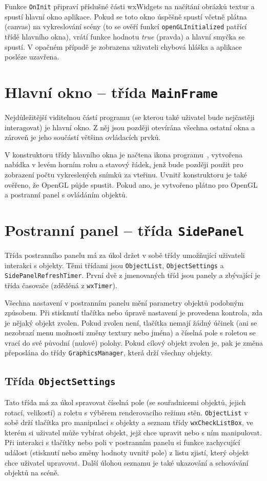 \documentclass[a4paper, 11pt]{report}
\begin{document}
Funkce \texttt{OnInit} připraví příslušné části wxWidgets na načítání obrázků textur a spustí hlavní okno aplikace. Pokud se toto okno úspěšně spustí včetně plátna (canvas) na vykreslování scény (to se ověří funkcí \texttt{openGLInitialized} patřící třídě hlavního okna), vrátí funkce hodnotu \emph{true} (pravda) a hlavní smyčka se spustí. V opačném případě je zobrazena uživateli chybová hláška a aplikace posléze uzavřena.

\section{Hlavní okno -- třída \texttt{MainFrame}}
Nejdůležitější viditelnou částí programu (se kterou také uživatel bude nejčastěji interagovat) je hlavní okno. Z něj jsou později otevírána všechna ostatní okna a zároveň je jeho součástí většina ovládacích prvků.

V konstruktoru třídy hlavního okna je načtena ikona programu~\cite{pic:icon}, vytvořena nabídka v levém horním rohu a stavový řádek, jenž bude později použit pro zobrazení počtu vykreslených snímků za vteřinu. Uvnitř konstruktoru je také ověřeno, že OpenGL půjde spustit. Pokud ano, je vytvořeno plátno pro OpenGL a postranní panel s ovládáním objektů.

\section{Postranní panel -- třída \texttt{SidePanel}}
Třída postranního panelu má za úkol držet v sobě třídy umožňující uživateli interakci s objekty. Těmi třídami jsou \texttt{ObjectList}, \texttt{ObjectSettings} a \texttt{SidePanelRefreshTimer}. První dvě z jmenovaných tříd jsou panely a zbývající je třída časovače (zděděná z \texttt{wxTimer}).

Všechna nastavení v postranním panelu mění parametry objektů podobným způsobem. Při stisknutí tlačítka nebo úpravě nastavení je provedena kontrola, zda je nějaký objekt zvolen. Pokud zvolen není, tlačítka nemají žádný účinek (ani se nezobrazí menu možnosti změny textury nebo jména) a číselná pole s roletou se vrací do své původní (nulové) polohy. Pokud cílový objekt zvolen je, pak je změna přeposlána do třídy \texttt{GraphicsManager}, která drží všechny objekty.

\subsection{Třída \texttt{ObjectSettings}}
Tato třída má za úkol spravovat číselná pole (se souřadnicemi objektů, jejich rotací, velikostí) a roletu s výběrem renderovacího režimu stěn. \texttt{ObjectList} v sobě drží tlačítka pro manipulaci s objekty a seznam třídy \texttt{wxCheckListBox}, ve kterém si uživatel může vybírat objekt, jejž chce upravit nebo s ním manipulovat. Při interakci s tlačítky nebo poli v postranním panelu si funkce zachycující událost (stisknutí nebo změny hodnoty uvnitř pole) z listu zjistí, který objekt chce uživatel upravovat. Další úlohou seznamu je také ukazování a schovávání objektů na scéně.
\end{document}

